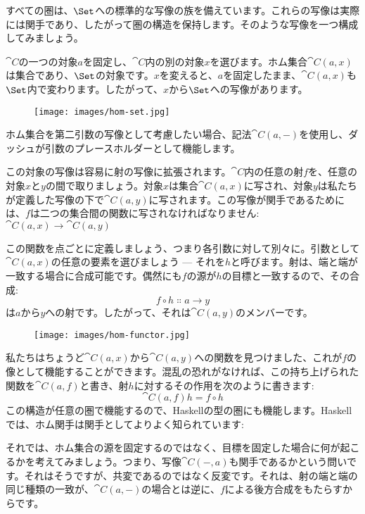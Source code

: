 すべての圏は、$\Set$への標準的な写像の族を備えています。これらの写像は実際には関手であり、したがって圏の構造を保持します。そのような写像を一つ構成してみましょう。

$\cat{C}$の一つの対象$a$を固定し、$\cat{C}$内の別の対象$x$を選びます。ホム集合$\cat{C}(a, x)$は集合であり、$\Set$の対象です。$x$を変えると、$a$を固定したまま、$\cat{C}(a, x)$も$\Set$内で変わります。したがって、$x$から$\Set$への写像があります。

\begin{figure}[H]
  \centering
  \texttt{[image: images/hom-set.jpg]}
\end{figure}

\noindent
ホム集合を第二引数の写像として考慮したい場合、記法$\cat{C}(a, -)$を使用し、ダッシュが引数のプレースホルダーとして機能します。

この対象の写像は容易に射の写像に拡張されます。$\cat{C}$内の任意の射$f$を、任意の対象$x$と$y$の間で取りましょう。対象$x$は集合$\cat{C}(a, x)$に写され、対象$y$は私たちが定義した写像の下で$\cat{C}(a, y)$に写されます。この写像が関手であるためには、$f$は二つの集合間の関数に写されなければなりません: $\cat{C}(a, x) \to \cat{C}(a, y)$

この関数を点ごとに定義しましょう、つまり各引数に対して別々に。引数として$\cat{C}(a, x)$の任意の要素を選びましょう --- それを$h$と呼びます。射は、端と端が一致する場合に合成可能です。偶然にも$f$の源が$h$の目標と一致するので、その合成: 
\[f \circ h \Colon a \to y\]
は$a$から$y$への射です。したがって、それは$\cat{C}(a, y)$のメンバーです。

\begin{figure}[H]
  \centering
  \texttt{[image: images/hom-functor.jpg]}
\end{figure}

\noindent
私たちはちょうど$\cat{C}(a, x)$から$\cat{C}(a, y)$への関数を見つけました、これが$f$の像として機能することができます。混乱の恐れがなければ、この持ち上げられた関数を$\cat{C}(a, f)$と書き、射$h$に対するその作用を次のように書きます: 
\[\cat{C}(a, f) h = f \circ h\]
この構造が任意の圏で機能するので、Haskellの型の圏にも機能します。Haskellでは、ホム関手は関手としてよりよく知られています: 


それでは、ホム集合の源を固定するのではなく、目標を固定した場合に何が起こるかを考えてみましょう。つまり、写像$\cat{C}(-, a)$も関手であるかという問いです。それはそうですが、共変であるのではなく反変です。それは、射の端と端の同じ種類の一致が、$\cat{C}(a, -)$の場合とは逆に、$f$による後方合成をもたらすからです。

